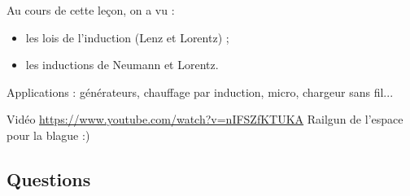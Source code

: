 Au cours de cette leçon, on a vu :
\begin{itemize}
\item les lois de l'induction (Lenz et Lorentz) ;
\item les inductions de Neumann et Lorentz.
\end{itemize}

\begin{slide}
Applications : générateurs, chauffage par induction, micro, chargeur sans fil...
\end{slide}

\begin{slide}
Vidéo \url{https://www.youtube.com/watch?v=nIFSZfKTUKA} Railgun de l'espace pour la blague :)	
\end{slide}


\subsection*{Questions}

